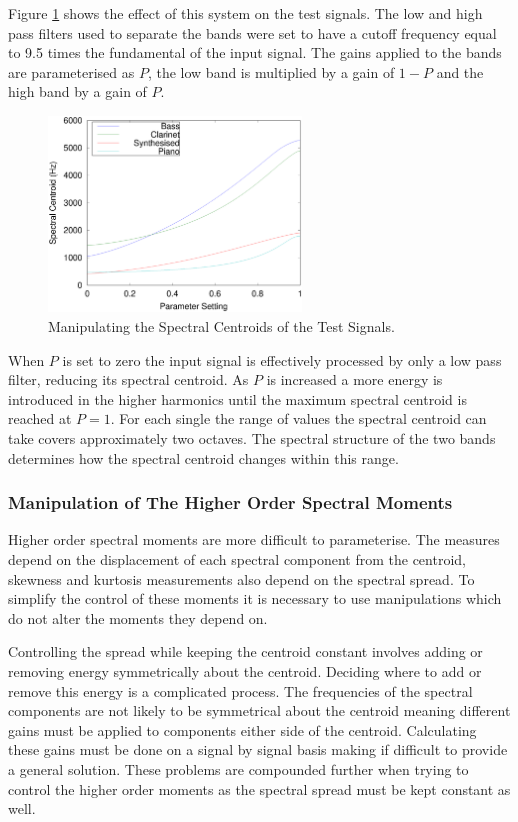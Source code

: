 			Figure \ref{fig:MoveCentroids} shows the effect of this system on the test signals. The low and
			high pass filters used to separate the bands were set to have a cutoff frequency equal to 9.5 times
			the fundamental of the input signal. The gains applied to the bands are parameterised as $P$, the
			low band is multiplied by a gain of $1 - P$ and the high band by a gain of $P$.

			\begin{figure}[h!]
				\centering
				\includegraphics[width=0.6\textwidth]{chapter6/Images/MoveCentroids.eps}
				\caption{Manipulating the Spectral Centroids of the Test Signals.}
				\label{fig:MoveCentroids}
			\end{figure}

			When $P$ is set to zero the input signal is effectively processed by only a low pass filter,
			reducing its spectral centroid. As $P$ is increased a more energy is introduced in the higher
			harmonics until the maximum spectral centroid is reached at $P = 1$. For each single the range of
			values the spectral centroid can take covers approximately two octaves. The spectral structure of
			the two bands determines how the spectral centroid changes within this range.

		\subsubsection*{Manipulation of The Higher Order Spectral Moments}
			Higher order spectral moments are more difficult to parameterise. The measures depend on the
			displacement of each spectral component from the centroid, skewness and kurtosis measurements also
			depend on the spectral spread. To simplify the control of these moments it is necessary to use
			manipulations which do not alter the moments they depend on. 
			
			Controlling the spread while keeping the centroid constant involves adding or removing energy
			symmetrically about the centroid. Deciding where to add or remove this energy is a complicated
			process. The frequencies of the spectral components are not likely to be symmetrical about the
			centroid meaning different gains must be applied to components either side of the centroid.
			Calculating these gains must be done on a signal by signal basis making if difficult to provide a
			general solution. These problems are compounded further when trying to control the higher order
			moments as the spectral spread must be kept constant as well.

